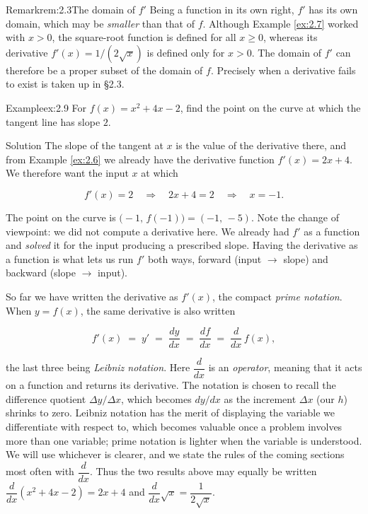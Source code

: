 \documentclass[a4paper,12pt,oneside]{memoir}
\begin{document}
\begin{envremark}{Remark}{rem:2.3}{The domain of \(f'\)}
Being a function in its own right, \(f'\) has its own domain, which may be \emph{smaller} than that of \(f\). Although Example \ref{ex:2.7} worked with \(x > 0\), the square-root function is defined for all \(x \ge 0\), whereas its derivative \(f'(x) = 1/(2\sqrt{x})\) is defined only for \(x > 0\). The domain of \(f'\) can therefore be a proper subset of the domain of \(f\). Precisely when a derivative fails to exist is taken up in §2.3.
\end{envremark}
\begin{workedexample}
\begin{envexample}{Example}{ex:2.9}{}
For \(f(x) = x^{2} + 4x - 2\), find the point on the curve at which the tangent line has slope \(2\).
\end{envexample}
\begin{envsolution}{Solution}{}{}
The slope of the tangent at \(x\) is the value of the derivative there, and from Example \ref{ex:2.6} we already have the derivative function \(f'(x) = 2x + 4\). We therefore want the input \(x\) at which

\[ f'(x) = 2 \quad\Longrightarrow\quad 2x + 4 = 2 \quad\Longrightarrow\quad x = -1. \]

The point on the curve is \(\bigl(-1,\, f(-1)\bigr) = (-1,\, -5)\). Note the change of viewpoint: we did not compute a derivative here. We already had \(f'\) as a function and \emph{solved} it for the input producing a prescribed slope. Having the derivative as a function is what lets us run \(f'\) both ways, forward (input \(\to\) slope) and backward (slope \(\to\) input).
\end{envsolution}
\end{workedexample}
So far we have written the derivative as \(f'(x)\), the compact \emph{prime notation}. When \(y = f(x)\), the same derivative is also written

\[ f'(x) \;=\; y' \;=\; \frac{dy}{dx} \;=\; \frac{df}{dx} \;=\; \frac{d}{dx}\,f(x), \]

the last three being \emph{Leibniz notation}. Here \(\dfrac{d}{dx}\) is an \emph{operator}, meaning that it acts on a function and returns its derivative. The notation is chosen to recall the difference quotient \(\Delta y / \Delta x\), which becomes \(dy/dx\) as the increment \(\Delta x\) (our \(h\)) shrinks to zero. Leibniz notation has the merit of displaying the variable we differentiate with respect to, which becomes valuable once a problem involves more than one variable; prime notation is lighter when the variable is understood. We will use whichever is clearer, and we state the rules of the coming sections most often with \(\dfrac{d}{dx}\). Thus the two results above may equally be written \(\dfrac{d}{dx}(x^{2} + 4x - 2) = 2x + 4\) and \(\dfrac{d}{dx}\sqrt{x} = \dfrac{1}{2\sqrt{x}}\).
\end{document}
